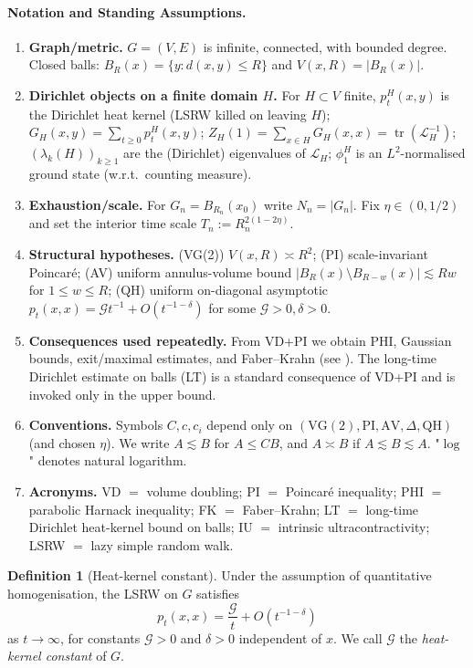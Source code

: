 \documentclass[reqno]{amsart}
\numberwithin{equation}{section}
\theoremstyle{definition}
\newtheorem{definition}[definition]{Definition}
\theoremstyle{remark}
\newcommand{\cG}{\mathcal{G}}
\DeclareMathOperator{\tr}{tr}
\newcommand{\LL}{\mathcal{L}}
\begin{document}
\paragraph{Notation and Standing Assumptions.}
\begin{enumerate}[label={}]
  \item \textbf{Graph/metric.} $G=(V,E)$ is infinite, connected, with bounded degree. Closed balls: $B_R(x)=\{y:d(x,y)\le R\}$ and $V(x,R)=|B_R(x)|$.
  \item \textbf{Dirichlet objects on a finite domain $H$.} For $H\subset V$ finite, $p_t^{H}(x,y)$ is the Dirichlet heat kernel (LSRW killed on leaving $H$); $G_H(x,y)=\sum_{t\ge0} p_t^{H}(x,y)$; $Z_H(1)=\sum_{x\in H} G_H(x,x)=\tr(\LL_H^{-1})$; $(\lambda_k(H))_{k\ge1}$ are the (Dirichlet) eigenvalues of $\LL_H$; $\phi_1^{H}$ is an $L^2$-normalised ground state (w.r.t.\ counting measure).
  \item \textbf{Exhaustion/scale.} For $G_n=B_{R_n}(x_0)$ write $N_n=|G_n|$. Fix $\eta\in(0,1/2)$ and set the interior time scale $T_n:=R_n^{2(1-2\eta)}$.
  \item \textbf{Structural hypotheses.} (VG(2)) $V(x,R)\asymp R^2$; (PI) scale-invariant Poincaré; (AV) uniform annulus-volume bound $|B_R(x)\setminus B_{R-w}(x)|\lesssim Rw$ for $1\le w\le R$; (QH) uniform on-diagonal asymptotic $p_t(x,x)=\cG t^{-1}+O(t^{-1-\delta})$ for some $\cG>0,\delta>0$.
  \item \textbf{Consequences used repeatedly.} From VD+PI we obtain PHI, Gaussian bounds, exit/maximal estimates, and Faber--Krahn (see ). The long-time Dirichlet estimate on balls (LT) is a standard consequence of VD+PI and is invoked only in the upper bound.
  \item \textbf{Conventions.} Symbols $C,c,c_i$ depend only on $(\mathrm{VG(2)},\mathrm{PI},\mathrm{AV},\Delta,\mathrm{QH})$ (and chosen $\eta$). We write $A\lesssim B$ for $A\le C B$, and $A\asymp B$ if $A\lesssim B\lesssim A$. "$\log$" denotes natural logarithm.
  \item \textbf{Acronyms.} VD $=$ volume doubling; PI $=$ Poincaré inequality; PHI $=$ parabolic Harnack inequality; FK $=$ Faber--Krahn; LT $=$ long-time Dirichlet heat-kernel bound on balls; IU $=$ intrinsic ultracontractivity; LSRW $=$ lazy simple random walk.
\end{enumerate}

\begin{definition}[Heat-kernel constant]\label{def:G}
Under the assumption of quantitative homogenisation, the LSRW on $G$ satisfies
\[
  p_t(x,x)=\frac{\cG}{t}+O(t^{-1-\delta})
\]
as $t\to\infty$, for constants $\cG>0$ and $\delta>0$ independent of $x$. We call $\cG$ the \emph{heat-kernel constant} of $G$.
\end{definition}
\end{document}
